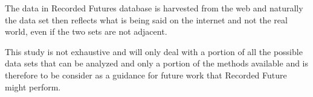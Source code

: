 The data in Recorded Futures database is harvested from the web and naturally the data set then reflects what is being said on the internet and not the real world, even if the two sets are not adjacent.

This study is not exhaustive and will only deal with a portion of all the possible data sets that can be analyzed and only a portion of the methods available and is therefore to be consider as a guidance for future work that Recorded Future might perform.
